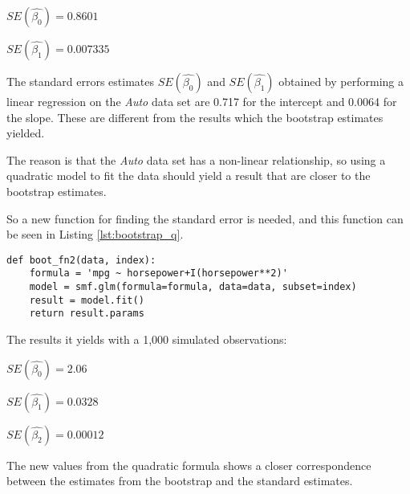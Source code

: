 \begin{center}
	$SE(\hat{\beta_0}) = 0.8601$
\end{center} 
\begin{center}
	$SE(\hat{\beta_1}) = 0.007335$
\end{center}

The standard errors estimates $SE(\hat{\beta_0})$ and $SE(\hat{\beta_1})$ obtained by performing a linear regression on the \emph{Auto} data set are 0.717 for the intercept and 0.0064 for the slope. These are different from the results which the bootstrap estimates yielded.

The reason is that the \emph{Auto} data set has a non-linear relationship, so using a quadratic model to fit the data should yield a result that are closer to the bootstrap estimates.

So a new function for finding the standard error is needed, and this function can be seen in Listing \ref{lst:bootstrap_q}.

\begin{lstlisting}[caption={Function to calculate standard error with a qudratic model}, label=lst:bootstrap_q, mathescape=true]
def boot_fn2(data, index):
	formula = 'mpg ~ horsepower+I(horsepower**2)'
	model = smf.glm(formula=formula, data=data, subset=index)
	result = model.fit()
	return result.params
\end{lstlisting}

The results it yields with a 1,000 simulated observations:

\begin{center}
	$SE(\hat{\beta_0}) = 2.06$
\end{center}
\begin{center}
	$SE(\hat{\beta_1}) = 0.0328$
\end{center}
\begin{center}
	$SE(\hat{\beta_2}) = 0.00012$
\end{center}

The new values from the quadratic formula shows a closer correspondence between the estimates from the bootstrap and the standard estimates.